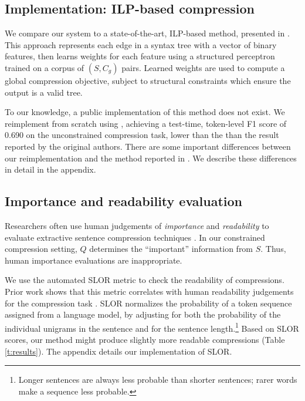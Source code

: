 \documentclass[11pt,a4paper]{article}
\begin{document}
\subsection{Implementation: ILP-based compression}\label{s:ilp}

We compare our system to a state-of-the-art, ILP-based method, presented in \citet{filippova2013overcoming}. This approach represents each edge in a syntax tree with a vector of binary features, then learns weights for each feature using a structured perceptron trained on a corpus of $(S,C_g)$ pairs. Learned weights are used to compute a global compression objective, subject to structural constraints which ensure the output is a valid tree.

To our knowledge, a public implementation of this method does not exist. We reimplement from scratch using \citet{gurobi}, achieving a test-time, token-level F1 score of  0.690 on the unconstrained compression task, lower than the than the result reported by the original authors. There are some important differences between our reimplementation and the method reported in \citet{filippova2013overcoming}. We describe these differences in detail in the appendix.

\subsection{Importance and readability evaluation}\label{s:readabilityinformativeness}

Researchers often use human judgements of \textit{importance} and \textit{readability} to evaluate extractive sentence compression techniques \cite{Knight2000StatisticsBasedS,clarke2008global,filippova2015sentence}. In our constrained compression setting, $Q$ determines the ``important'' information from $S$. Thus, human importance evaluations are inappropriate.

We use the automated SLOR metric \cite{lau2015unsupervised} to check the readability of compressions. Prior work shows that this metric correlates with human readability judgements for the compression task \cite{kannConl}. SLOR normalizes the probability of a token sequence assigned from a language model, by adjusting for both the probability of the individual unigrams in the sentence and for the sentence length.\footnote{Longer sentences are always less probable than shorter sentences; rarer words make a sequence less probable.} Based on SLOR scores, our method might produce slightly more readable compressions (Table \ref{t:results}). The appendix details our implementation of SLOR. 
\end{document}
